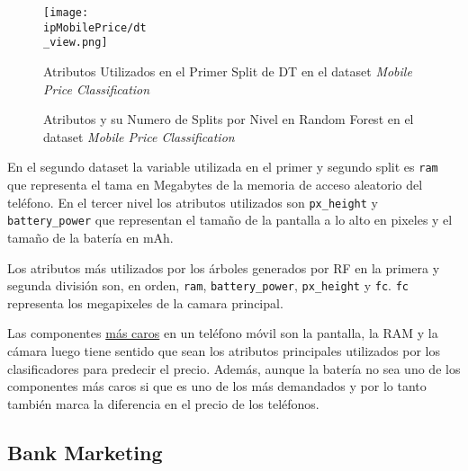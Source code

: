 \documentclass[..]{subfiles}
\begin{document}
\begin{figure}[h!]
	\centering
	\texttt{[image: \\ipMobilePrice/dt\\\_view.png]}
	\caption{Atributos Utilizados en el Primer Split de DT en el dataset \textit{Mobile Price Classification}}%
\end{figure}

\begin{figure}[h!]
\centering
{}
\caption{Atributos y su Numero de Splits por Nivel en Random Forest en el dataset \textit{Mobile Price Classification}}%
\end{figure}

En el segundo dataset la variable utilizada en el primer y segundo split es \texttt{ram} que representa el tama en Megabytes de la memoria de acceso aleatorio del teléfono. En el tercer nivel los atributos utilizados son \texttt{px\_height} y \texttt{battery\_power} que representan el tamaño de la pantalla a lo alto en pixeles y el tamaño de la batería en mAh.

Los  atributos más utilizados por los árboles generados por RF en la primera y segunda división son, en orden, \texttt{ram}, \texttt{battery\_power}, \texttt{px\_height} y \texttt{fc}. \texttt{fc} representa los megapixeles de la camara principal.

Las componentes \href{https://www.lanacion.com.ar/tecnologia/cuales-son-los-5-componentes-mas-caros-de-un-celular-nid2088336/}{más caros} en un teléfono móvil son la pantalla, la RAM y la cámara luego tiene sentido que sean los atributos principales utilizados por los clasificadores para predecir el precio. Además, aunque la batería no sea uno de los componentes más caros si que es uno de los más demandados y por lo tanto también marca la diferencia en el precio de los teléfonos.


\subsection{Bank Marketing}
\end{document}
